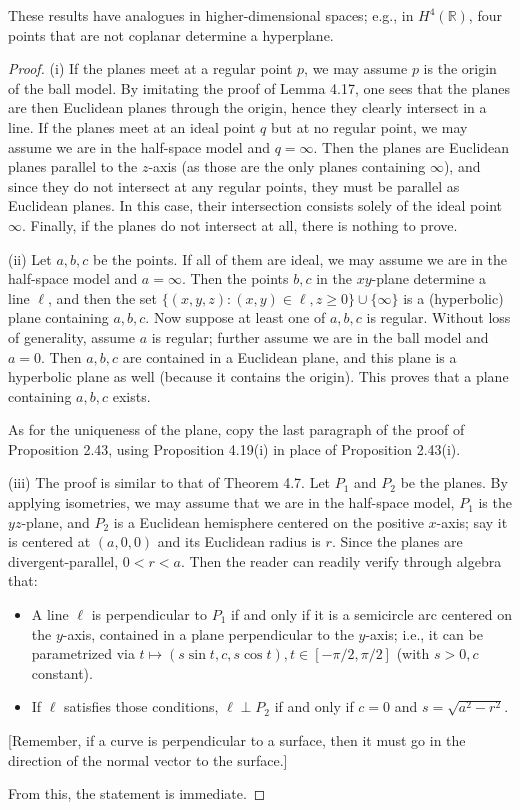 \documentclass[leqno]{book}
\begin{document}
\noindent These results have analogues in higher-dimensional spaces; e.g., in $H^4(\mathbb R)$, four points that are not coplanar determine a hyperplane.
\begin{proof}
(i) If the planes meet at a regular point $p$, we may assume $p$ is the origin of the ball model.  By imitating the proof of Lemma 4.17, one sees that the planes are then Euclidean planes through the origin, hence they clearly intersect in a line.  If the planes meet at an ideal point $q$ but at no regular point, we may assume we are in the half-space model and $q=\infty$.  Then the planes are Euclidean planes parallel to the $z$-axis (as those are the only planes containing $\infty$), and since they do not intersect at any regular points, they must be parallel as Euclidean planes.  In this case, their intersection consists solely of the ideal point $\infty$.  Finally, if the planes do not intersect at all, there is nothing to prove.

(ii) Let $a,b,c$ be the points.  If all of them are ideal, we may assume we are in the half-space model and $a=\infty$.  Then the points $b,c$ in the $xy$-plane determine a line $\ell$, and then the set $\{(x,y,z):(x,y)\in\ell,z\geqslant 0\}\cup\{\infty\}$ is a (hyperbolic) plane containing $a,b,c$.  Now suppose at least one of $a,b,c$ is regular.  Without loss of generality, assume $a$ is regular; further assume we are in the ball model and $a=0$.  Then $a,b,c$ are contained in a Euclidean plane, and this plane is a hyperbolic plane as well (because it contains the origin).  This proves that a plane containing $a,b,c$ exists.

As for the uniqueness of the plane, copy the last paragraph of the proof of Proposition 2.43, using Proposition 4.19(i) in place of Proposition 2.43(i).

(iii) The proof is similar to that of Theorem 4.7.  Let $P_1$ and $P_2$ be the planes.  By applying isometries, we may assume that we are in the half-space model, $P_1$ is the $yz$-plane, and $P_2$ is a Euclidean hemisphere centered on the positive $x$-axis; say it is centered at $(a,0,0)$ and its Euclidean radius is $r$.  Since the planes are divergent-parallel, $0<r<a$.  Then the reader can readily verify through algebra that:
\begin{itemize}
\item A line $\ell$ is perpendicular to $P_1$ if and only if it is a semicircle arc centered on the $y$-axis, contained in a plane perpendicular to the $y$-axis; i.e., it can be parametrized via $t\mapsto(s\sin t,c,s\cos t),t\in[-\pi/2,\pi/2]$ (with $s>0,c$ constant).

\item If $\ell$ satisfies those conditions, $\ell\perp P_2$ if and only if $c=0$ and $s=\sqrt{a^2-r^2}$.
\end{itemize}
[Remember, if a curve is perpendicular to a surface, then it must go in the direction of the normal vector to the surface.]

From this, the statement is immediate.
\end{proof}
\end{document}
